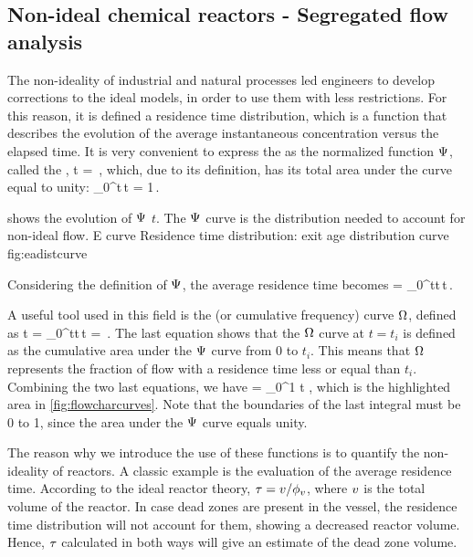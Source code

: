 \subsection{Non-ideal chemical reactors - Segregated flow analysis}
The non-ideality of industrial and natural processes led engineers to develop corrections to the ideal models, in order to use them with less restrictions. For this reason, it is defined a residence time distribution, which is a function that describes the evolution of the average instantaneous concentration versus the elapsed time. It is very convenient to express the  as the normalized function $\Psi$, called the ,
\beq
\eadist\vat t = \,,
\eeq
which, due to its definition, has its total area under the curve equal to unity:
\beq
\int_0^\infty\eadist\vat t\,\dx t = 1\,.
\eeq

 shows the evolution of $\Psi$ \vs $t$. The $\Psi$ curve is the distribution needed to account for non-ideal flow.
%
   {E curve}
   {Residence time distribution: exit age distribution curve}%
   {fig:eadistcurve}%

Considering the definition of $\Psi$, the average residence time becomes
\beq
\rtime = \int_0^\infty t\eadist\vat t\,\dx t\,.
\eeq

A useful tool used in this field is the  (or cumulative frequency) curve $\Omega$, defined as
\beq
\crtfrac\vat t = \int_0^\infty t\eadist\vat t\,\dx t 
               = \,.
\eeq
The last equation shows that the $\Omega$ curve at $t = t_i$ is defined as the cumulative area under the $\Psi$ curve from 0 to $t_i$. This means that $\Omega$ represents the fraction of flow with a residence time less or equal than $t_i$. Combining the two last equations, we have
\beq
\rtime = \int_0^1 t\,\dx\crtfrac\,,
\eeq
which is the highlighted area in \cref{fig:flowcharcurves}. Note that the boundaries of the last integral must be 0 to 1, since the area under the $\Psi$ curve equals unity.

The reason why we introduce the use of these functions is to quantify the non-ideality of reactors. A classic example is the evaluation of the average residence time. According to the ideal reactor theory, $\tau = v/\phi_{v}$, where $v$ is the total volume of the reactor. In case dead zones are present in the vessel, the residence time distribution will not account for them, showing a decreased reactor volume. Hence, $\tau$ calculated in both ways will give an estimate of the dead zone volume.

